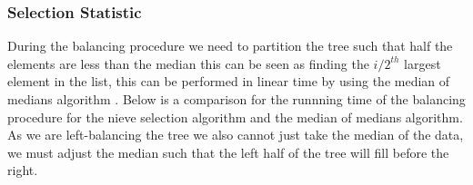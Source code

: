 \subsubsection{Selection Statistic}
During the balancing procedure we need to partition the tree such that half the elements are less than the median
this can be seen as finding the $i/2^{th}$ largest element in the list, this can be performed in linear time by using
the median of medians algorithm . Below is a comparison for the runnning time of the balancing procedure for
the nieve selection algorithm and the median of medians algorithm. As we are left-balancing the tree we also cannot
just take the median of the data, we must adjust the median such that the left half of the tree will fill before the right.

